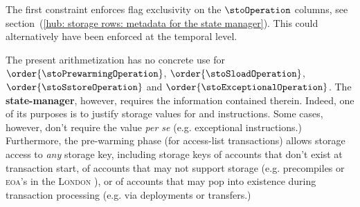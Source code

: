 \saNote{} \label{hub: consistencies: storage: constraints: exclusivity for the storage operation types}
The first constraint enforces flag exclusivity on the $\stoOperation$ columns, see section~(\ref{hub: storage rows: metadata for the state manager}).
This could alternatively have been enforced at the temporal level.

\saNote{} \label{hub: consistencies: storage: constraints: state manager columns}
The present arithmetization has no concrete use for
$\order{\stoPrewarmingOperation}$,
$\order{\stoSloadOperation}$,
$\order{\stoSstoreOperation}$ and
$\order{\stoExceptionalOperation}$.
The \textbf{state-manager}, however, requires the information contained therein.
Indeed, one of its purposes is to justify storage values for  and  instructions.
Some cases, however, don't require the value \emph{per se} (e.g. exceptional  instructions.)
Furthermore, the pre-warming phase (for access-list transactions) allows storage access to \emph{any} storage key,
including storage keys of accounts that don't exist at transaction start,
of accounts that may not support storage (e.g. precompiles or \textsc{eoa}'s in the \textsc{London} \evm{}),
or of accounts that may pop into existence during transaction processing (e.g. via deployments or transfers.)
